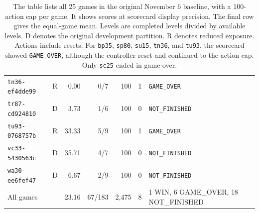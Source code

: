 \begin{table}[H]
\begin{tabularx}{\linewidth}{@{}lcrrrrY@{}}
\texttt{tn36-ef4dde99} & R & 0.00 & 0/7 & 100 & 1 & \texttt{GAME\_OVER}\\
\texttt{tr87-cd924810} & D & 3.73 & 1/6 & 100 & 0 & \texttt{NOT\_FINISHED}\\
\texttt{tu93-0768757b} & R & 33.33 & 5/9 & 100 & 1 & \texttt{GAME\_OVER}\\
\texttt{vc33-5430563c} & D & 35.71 & 4/7 & 100 & 0 & \texttt{NOT\_FINISHED}\\
\texttt{wa30-ee6fef47} & D & 6.67 & 2/9 & 100 & 0 & \texttt{NOT\_FINISHED}\\
\midrule
All games & & 23.16 & 67/183 & 2,475 & 8 & 1 WIN, 6 GAME\_OVER, 18 NOT\_FINISHED\\\bottomrule
\end{tabularx}
\caption{The table lists all 25 games in the original November 6 baseline, with a 100-action cap per game. It shows scores at scorecard display precision. The final row gives the equal-game mean. Levels are completed levels divided by available levels. D denotes the original development partition. R denotes reduced exposure. Actions include resets. For \texttt{bp35}, \texttt{sp80}, \texttt{su15}, \texttt{tn36}, and \texttt{tu93}, the scorecard showed \texttt{GAME\_OVER}, although the controller reset and continued to the action cap. Only \texttt{sc25} ended in game-over.}\label{tab:games}
\end{table}
